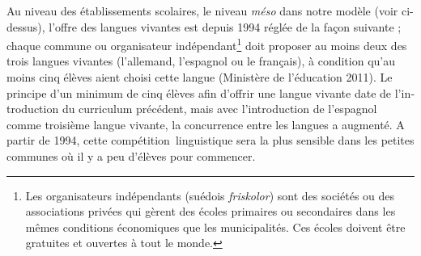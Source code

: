 \documentclass[french, output=paper]{langscibook}
\begin{document}
\begin{otherlanguage}{french}
Au niveau des établissements scolaires, le niveau \textit{méso} dans notre modèle (voir  ci-dessus), l’offre des langues vivantes est depuis 1994 réglée de la façon suivante ; chaque commune ou organisateur indépendant\footnote{Les organisateurs indépendants (suédois \textit{friskolor}) sont des sociétés ou des associations privées qui gèrent des écoles primaires ou secondaires dans les mêmes conditions économiques que les municipalités. Ces écoles doivent être gratuites et ouvertes à tout le monde.}  doit proposer au moins deux des trois langues vivantes (l’allemand, l’espagnol ou le français), à condition qu’au moins cinq élèves aient choisi cette langue (Ministère de l’éducation 2011). Le principe d’un minimum de cinq élèves afin d’offrir une langue vivante date de l’introduction du curriculum précédent, mais avec l’introduction de l’espagnol comme troisième langue vivante, la concurrence entre les langues a augmenté. A partir de 1994, cette compétition~linguistique sera la plus sensible dans les petites communes où il y a peu d’élèves pour commencer. 


\end{otherlanguage}
\end{document}
